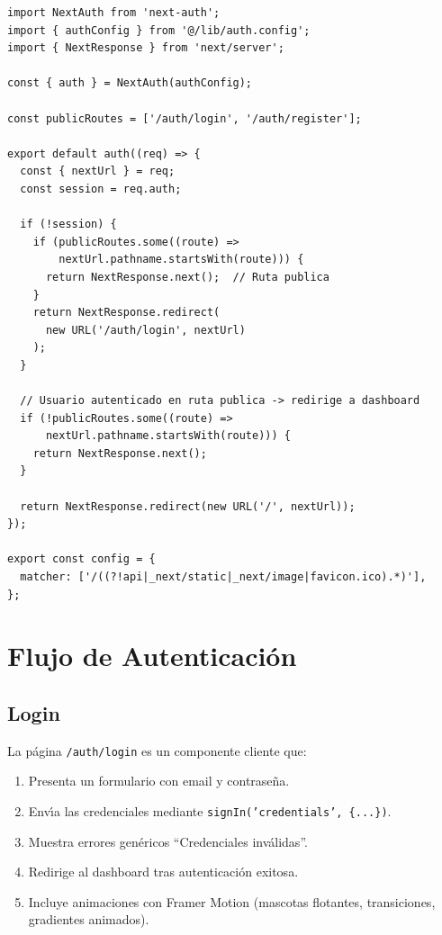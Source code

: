 \begin{lstlisting}[style=typescript, caption=middleware.ts - Proteccion de rutas]
import NextAuth from 'next-auth';
import { authConfig } from '@/lib/auth.config';
import { NextResponse } from 'next/server';

const { auth } = NextAuth(authConfig);

const publicRoutes = ['/auth/login', '/auth/register'];

export default auth((req) => {
  const { nextUrl } = req;
  const session = req.auth;

  if (!session) {
    if (publicRoutes.some((route) =>
        nextUrl.pathname.startsWith(route))) {
      return NextResponse.next();  // Ruta publica
    }
    return NextResponse.redirect(
      new URL('/auth/login', nextUrl)
    );
  }

  // Usuario autenticado en ruta publica -> redirige a dashboard
  if (!publicRoutes.some((route) =>
      nextUrl.pathname.startsWith(route))) {
    return NextResponse.next();
  }

  return NextResponse.redirect(new URL('/', nextUrl));
});

export const config = {
  matcher: ['/((?!api|_next/static|_next/image|favicon.ico).*)'],
};
\end{lstlisting}

\section{Flujo de Autenticaci\'on}

\subsection{Login}

La p\'agina \texttt{/auth/login} es un componente cliente que:

\begin{enumerate}
    \item Presenta un formulario con email y contrase\~na.
    \item Env\'{\i}a las credenciales mediante \texttt{signIn('credentials',
          \{...\})}.
    \item Muestra errores gen\'ericos ``Credenciales inv\'alidas''.
    \item Redirige al dashboard tras autenticaci\'on exitosa.
    \item Incluye animaciones con Framer Motion (mascotas flotantes,
          transiciones, gradientes animados).
\end{enumerate}

